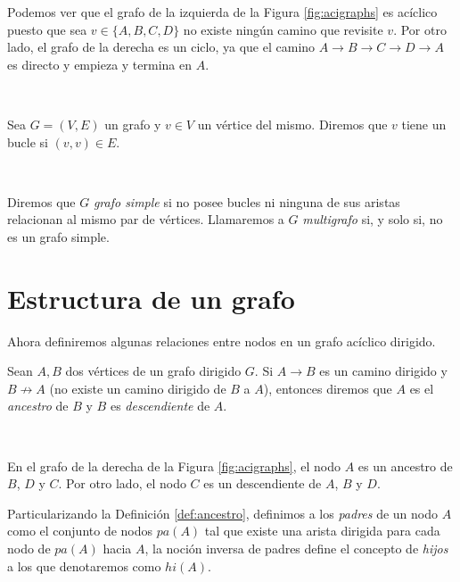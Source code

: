 \documentclass[oneside,openright,titlepage,numbers=noenddot,openany,headinclude,footinclude=true,
cleardoublepage=empty,abstractoff,BCOR=5mm,paper=a4,fontsize=12pt,main=spanish]{scrreprt}
\begin{document}
\begin{example}
Podemos ver que el grafo de la izquierda de la Figura \ref{fig:acigraphs} es acíclico puesto que sea $v\in \{A,B,C,D\}$ no existe ningún camino que revisite $v$. Por otro lado, el grafo de la derecha es un ciclo, ya que el camino $A\to B \to C \to D \to A$ es directo y empieza y termina en $A$.
\end{example}\

\begin{definition}[Bucle]
Sea $G=(V,E)$ un grafo y $v\in V$ un vértice del mismo. Diremos que $v$ tiene un bucle si $(v,v)\in E$.
\end{definition}\

\begin{definition}
Diremos que $G$ \textit{grafo simple} si no posee bucles ni ninguna de sus aristas relacionan al mismo par de vértices. Llamaremos a $G$ \textit{multigrafo} si, y solo si, no es un grafo simple.
\end{definition}

\section{Estructura de un grafo}

Ahora definiremos algunas relaciones entre nodos en un grafo acíclico dirigido.\\

\begin{definition} \label{def:ancestro}
Sean $A,B$ dos vértices de un grafo dirigido $G$. Si $A \to B$ es un camino dirigido y $B \not \to A$ (no existe un camino dirigido de $B$ a $A$), entonces diremos que $A$ es el \textit{ancestro} de $B$ y $B$ es \textit{descendiente} de $A$.
\end{definition}\

\begin{example}
En el grafo de la derecha de la Figura \ref{fig:acigraphs}, el nodo $A$ es un ancestro de  $B$, $D$ y $C$. Por otro lado, el nodo $C$ es un descendiente de $A$, $B$ y $D$.
\end{example}

\clearpage

\begin{definition}
Particularizando la Definición \ref{def:ancestro}, definimos a los \textit{padres} de un nodo $A$ como el conjunto de nodos $pa(A)$ tal que existe una arista dirigida para cada nodo de $pa(A)$ hacia $A$, la noción inversa de padres define el concepto de \textit{hijos} a los que denotaremos como $hi(A)$.
\end{definition}\
\end{document}
